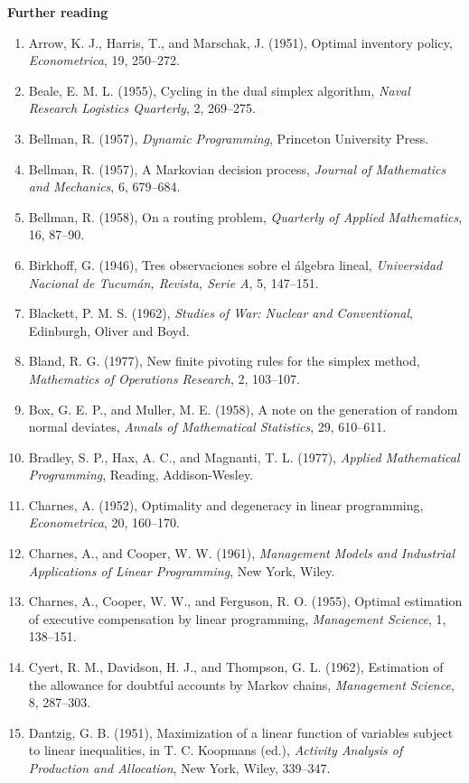 \documentclass[11pt,a4paper]{article}
\numberwithin{equation}{section}
\theoremstyle{definition}
\newcommand{\subhead}[1]{%
  \par\medskip\noindent\textbf{#1}\par\nobreak\smallskip}
\begin{document}
\subhead{Further reading}
\begin{enumerate}
\item Arrow, K. J., Harris, T., and Marschak, J. (1951), Optimal inventory policy, \emph{Econometrica}, 19, 250--272.
\item Beale, E. M. L. (1955), Cycling in the dual simplex algorithm, \emph{Naval Research Logistics Quarterly}, 2, 269--275.
\item Bellman, R. (1957), \emph{Dynamic Programming}, Princeton University Press.
\item Bellman, R. (1957), A Markovian decision process, \emph{Journal of Mathematics and Mechanics}, 6, 679--684.
\item Bellman, R. (1958), On a routing problem, \emph{Quarterly of Applied Mathematics}, 16, 87--90.
\item Birkhoff, G. (1946), Tres observaciones sobre el \'algebra lineal, \emph{Universidad Nacional de Tucum\'an, Revista, Serie A}, 5, 147--151.
\item Blackett, P. M. S. (1962), \emph{Studies of War: Nuclear and Conventional}, Edinburgh, Oliver and Boyd.
\item Bland, R. G. (1977), New finite pivoting rules for the simplex method, \emph{Mathematics of Operations Research}, 2, 103--107.
\item Box, G. E. P., and Muller, M. E. (1958), A note on the generation of random normal deviates, \emph{Annals of Mathematical Statistics}, 29, 610--611.
\item Bradley, S. P., Hax, A. C., and Magnanti, T. L. (1977), \emph{Applied Mathematical Programming}, Reading, Addison-Wesley.
\item Charnes, A. (1952), Optimality and degeneracy in linear programming, \emph{Econometrica}, 20, 160--170.
\item Charnes, A., and Cooper, W. W. (1961), \emph{Management Models and Industrial Applications of Linear Programming}, New York, Wiley.
\item Charnes, A., Cooper, W. W., and Ferguson, R. O. (1955), Optimal estimation of executive compensation by linear programming, \emph{Management Science}, 1, 138--151.
\item Cyert, R. M., Davidson, H. J., and Thompson, G. L. (1962), Estimation of the allowance for doubtful accounts by Markov chains, \emph{Management Science}, 8, 287--303.
\item Dantzig, G. B. (1951), Maximization of a linear function of variables subject to linear inequalities, in T. C. Koopmans (ed.), \emph{Activity Analysis of Production and Allocation}, New York, Wiley, 339--347.

\end{enumerate}
\end{document}
